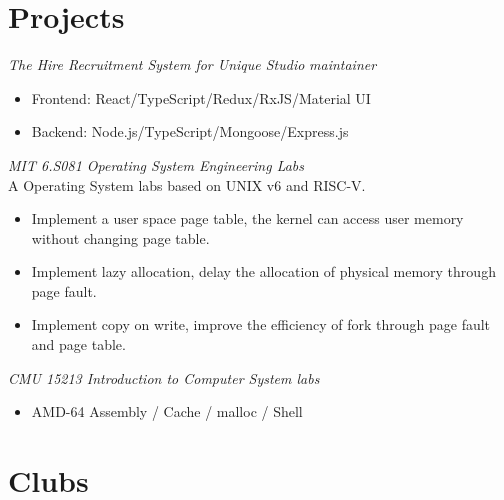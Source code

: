 \documentclass{uniquecv}
\begin{document}

\section{Projects}

{\it The Hire Recruitment System for Unique Studio}
\quad \emph{maintainer}
\vspace{0.4ex}

\begin{itemize}
  \item Frontend: React/TypeScript/Redux/RxJS/Material UI
  \item Backend: Node.js/TypeScript/Mongoose/Express.js
\end{itemize}

{\it MIT 6.S081 Operating System Engineering Labs}
\vspace{0.4ex}
\\
A Operating System labs based on UNIX v6 and RISC-V.
\begin{itemize}
  \item Implement a user space page table, the kernel can access user memory without changing page table.
  \item Implement lazy allocation, delay the allocation of physical memory through page fault.
  \item Implement copy on write, improve the efficiency of fork through page fault and page table.
\end{itemize}

{\it CMU 15213 Introduction to Computer System labs}
\vspace{0.4ex}
\begin{itemize}
  \item AMD-64 Assembly / Cache / malloc / Shell
\end{itemize}


\section{Clubs}
\end{document}
